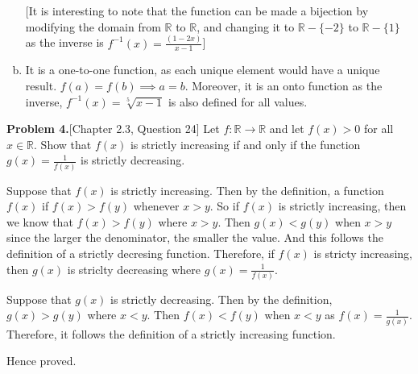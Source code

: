 \documentclass[addpoints]{exam}
\begin{document}
\begin{sloppypar}
\begin{questions}
\begin{solution}
\begin{enumerate}[(a)]
                [It is interesting to note that the function can be made a bijection by modifying the domain from $ \mathbb{R} $ to $\mathbb{R}$, and changing it to $ \mathbb{R} - \{-2\} $ to $ \mathbb{R} - \{1\} $ as the inverse is $ f^{-1}(x) = \frac{(1 - 2x)}{x - 1} $]

                \item It is a one-to-one function, as each unique element would have a unique result. $ f(a) = f(b) \implies a = b $. Moreover, it is an onto function as the inverse, $ f^{-1}(x) = \sqrt[5]{x - 1} $ is also defined for all values.
            \end{enumerate}
        \end{solution}

    \question\textbf{Problem 4.}[Chapter 2.3, Question 24]
    Let $ f: \mathbb{R} \rightarrow \mathbb{R}$ and let $ f(x) > 0 $ for all $ x \in \mathbb{R}$. Show that $f(x)$ is strictly increasing if and only if the function $g(x) = \frac{1}{f(x)}$ is strictly decreasing. 
        \begin{solution}
            Suppose that $ f(x) $ is strictly increasing. Then by the definition, a function $ f(x) $ if $ f(x) > f(y) $ whenever $ x > y $. So if $ f(x) $ is strictly increasing, then we know that $ f(x) > f(y) $ where $ x > y $. Then $ g(x) < g(y) $ when $ x > y $ since the larger the denominator, the smaller the value. And this follows the definition of a strictly decresing function. Therefore, if $f(x)$ is stricty increasing, then $g(x)$ is striclty decreasing where $ g(x) = \frac{1}{f(x)} $. 

            Suppose that $ g(x) $ is strictly decreasing. Then by the definition, $ g(x) > g(y) $ where $ x < y $. Then $ f(x) < f(y) $ when $ x < y $ as $ f(x) = \frac{1}{g(x)} $. Therefore, it follows the definition of a strictly increasing function. 

            Hence proved. 
        \end{solution}


\end{questions}
\end{sloppypar}
\end{document}
